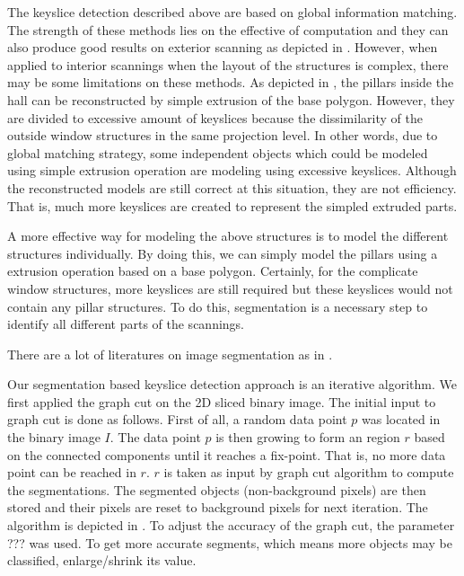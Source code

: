 The keyslice detection described above are based on global information matching.
The strength of these methods lies on the effective of computation and they can
also produce good results on exterior scanning as depicted in . 
However, when applied to interior scannings when the layout of the structures 
is complex, there may be some limitations on these methods. 
As depicted in , the pillars inside the hall can be reconstructed
by simple extrusion of the base polygon. However, they are divided to 
excessive amount of keyslices because the dissimilarity of the outside window
structures in the same projection level. In other words, due to global matching
strategy, some independent objects which could be modeled using simple extrusion
operation are modeling using excessive keyslices. Although the reconstructed
models are still correct at this situation, they are not efficiency. That is, much
more keyslices are created to represent the simpled extruded parts. 

A more effective way for modeling the above structures is to model the different 
structures individually. By doing this, we can simply model the pillars using a
extrusion operation based on a base polygon. Certainly, for the complicate window
structures, more keyslices are still required but these keyslices would not contain
any pillar structures. To do this, segmentation is a necessary step to identify
all different parts of the scannings. 

There are a lot of literatures on image segmentation as in \cite{segmentation}. 

Our segmentation based keyslice detection approach is an iterative algorithm.
We first applied the graph cut
on the 2D sliced binary image. The initial input to graph cut is done as follows. 
First of all, a random data point $p$ was located in the binary image $I$. The data
point $p$ is then growing to form an region $r$ based on the connected components 
until it reaches a fix-point. That is, no more data point can be reached in $r$. $r$
is taken as input by graph cut algorithm to compute the segmentations. 
The segmented objects (non-background pixels) are then stored and their pixels are 
reset to background pixels for next iteration. The algorithm is depicted in .
To adjust the accuracy of the graph cut, the parameter ??? was used. To get more
accurate segments, which means more objects may be classified, enlarge/shrink its value.

